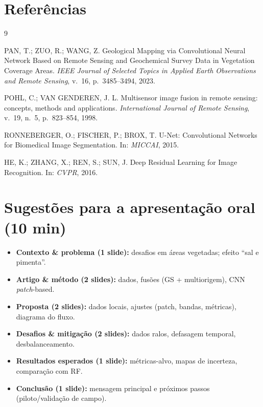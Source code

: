 \documentclass[12pt,a4paper]{article}
\begin{document}
\section{Referências}
\begin{thebibliography}{9}

PAN, T.; ZUO, R.; WANG, Z.
Geological Mapping via Convolutional Neural Network Based on Remote Sensing and Geochemical Survey Data in Vegetation Coverage Areas.
\textit{IEEE Journal of Selected Topics in Applied Earth Observations and Remote Sensing}, v.~16, p.~3485--3494, 2023.

POHL, C.; VAN GENDEREN, J. L.
Multisensor image fusion in remote sensing: concepts, methods and applications.
\textit{International Journal of Remote Sensing}, v.~19, n.~5, p.~823--854, 1998.

RONNEBERGER, O.; FISCHER, P.; BROX, T.
U-Net: Convolutional Networks for Biomedical Image Segmentation.
In: \textit{MICCAI}, 2015.

HE, K.; ZHANG, X.; REN, S.; SUN, J.
Deep Residual Learning for Image Recognition.
In: \textit{CVPR}, 2016.

\end{thebibliography}

\section*{Sugestões para a apresentação oral (10 min)}
\begin{itemize}[leftmargin=1.2cm]
  \item \textbf{Contexto \& problema (1 slide):} desafios em áreas vegetadas; efeito ``sal e pimenta''.
  \item \textbf{Artigo \& método (2 slides):} dados, fusões (GS + multiorigem), CNN \emph{patch}-based.
  \item \textbf{Proposta (2 slides):} dados locais, ajustes (patch, bandas, métricas), diagrama do fluxo.
  \item \textbf{Desafios \& mitigação (2 slides):} dados ralos, defasagem temporal, desbalanceamento.
  \item \textbf{Resultados esperados (1 slide):} métricas-alvo, mapas de incerteza, comparação com RF.
  \item \textbf{Conclusão (1 slide):} mensagem principal e próximos passos (piloto/validação de campo).
\end{itemize}
\end{document}
